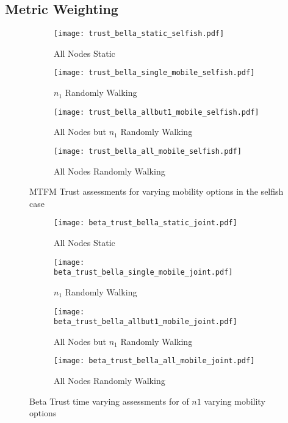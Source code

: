\subsection{Metric Weighting}
\begin{figure}
\begin{subfigure}{.5\textwidth}
  \centering
  \texttt{[image: trust\_bella\_static\_selfish.pdf]}
  \caption{All Nodes Static}
  \label{fig:selfish_trust_static}
\end{subfigure}%
\begin{subfigure}{.5\textwidth}
  \centering
  \texttt{[image: trust\_bella\_single\_mobile\_selfish.pdf]}
  \caption{$n_1$ Randomly Walking}
  \label{fig:selfish_trust_single}
\end{subfigure}
\begin{subfigure}{.5\textwidth}
\centering
  \texttt{[image: trust\_bella\_allbut1\_mobile\_selfish.pdf]}
  \caption{All Nodes but $n_1$ Randomly Walking}
  \label{fig:selfish_trust_allbut1}
\end{subfigure}
\begin{subfigure}{.5\textwidth}
\centering
  \texttt{[image: trust\_bella\_all\_mobile\_selfish.pdf]}
  \caption{All Nodes Randomly Walking}
  \label{fig:selfish_trust_all_mobile}
\end{subfigure}
\caption{MTFM Trust assessments for varying mobility options in the selfish case}
\label{fig:trust_mobility}
\end{figure}



\begin{figure}
\begin{subfigure}{\textwidth}
  \centering
  \texttt{[image: beta\_trust\_bella\_static\_joint.pdf]}
  \caption{All Nodes Static}
  \label{fig:beta_trust_static}
\end{subfigure}
\begin{subfigure}{\textwidth}
  \centering
  \texttt{[image: beta\_trust\_bella\_single\_mobile\_joint.pdf]}
  \caption{$n_1$ Randomly Walking}
  \label{fig:beta_trust_single}
\end{subfigure}
\begin{subfigure}{\textwidth}
\centering
  \texttt{[image: beta\_trust\_bella\_allbut1\_mobile\_joint.pdf]}
  \caption{All Nodes but $n_1$ Randomly Walking}
  \label{fig:beta_trust_allbut1}
\end{subfigure}
\begin{subfigure}{\textwidth}
\centering
  \texttt{[image: beta\_trust\_bella\_all\_mobile\_joint.pdf]}
  \caption{All Nodes Randomly Walking}
  \label{fig:beta_trust_all_mobile}
\end{subfigure}
\caption{Beta Trust time varying assessments for of $n1$ varying mobility options}
\label{fig:trust_mobility}
\end{figure}



